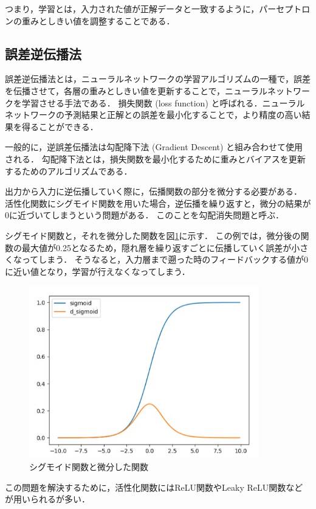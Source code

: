 \documentclass[a4j,12pt,dvipdfmx]{jreport}
\begin{document}
つまり，学習とは，入力された値が正解データと一致するように，パーセプトロンの重みとしきい値を調整することである．

\subsection{誤差逆伝播法}
誤差逆伝播法とは，ニューラルネットワークの学習アルゴリズムの一種で，誤差を伝播させて，各層の重みとしきい値を更新することで，ニューラルネットワークを学習させる手法である\cite{ANN}\cite{G}．
損失関数 (loss function) と呼ばれる．ニューラルネットワークの予測結果と正解との誤差を最小化することで，より精度の高い結果を得ることができる．

一般的に，逆誤差伝播法は勾配降下法 (Gradient Descent) と組み合わせて使用される．
勾配降下法とは，損失関数を最小化するために重みとバイアスを更新するためのアルゴリズムである．

出力から入力に逆伝播していく際に，伝播関数の部分を微分する必要がある．
活性化関数にシグモイド関数を用いた場合，逆伝播を繰り返すと，微分の結果が0に近づいてしまうという問題がある．
このことを勾配消失問題と呼ぶ．

シグモイド関数と，それを微分した関数を図\ref{fig:sigmoid}に示す．
この例では，微分後の関数の最大値が0.25となるため，隠れ層を繰り返すごとに伝播していく誤差が小さくなってしまう．
そうなると，入力層まで遡った時のフィードバックする値が0に近い値となり，学習が行えなくなってしまう．

\begin{figure}[b]
  \centering
  \includegraphics[width=10cm]{image/sigmoid.jpg}
  \caption{シグモイド関数と微分した関数}
  \label{fig:sigmoid}
\end{figure}

この問題を解決するために，活性化関数にはReLU関数やLeaky ReLU関数などが用いられるが多い．
\end{document}
